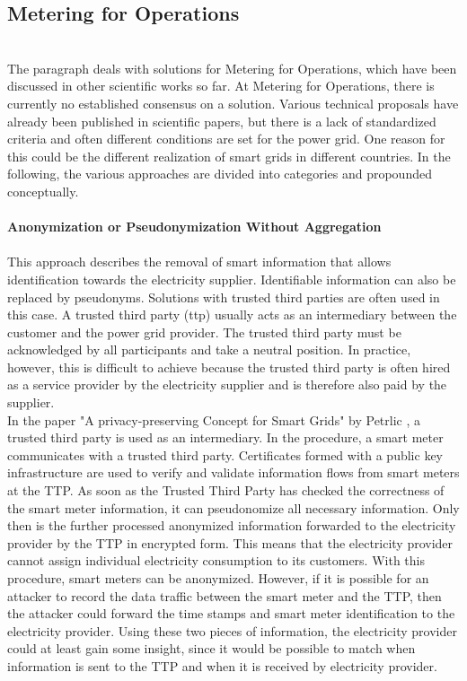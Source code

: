 \subsection{Metering for Operations}
\label{subsec:Meter_for_Op}
\\
The paragraph deals with solutions for Metering for Operations, which have been discussed in other scientific works so far. At Metering for Operations, there is currently no established consensus on a solution. Various technical proposals have already been published in scientific papers, but there is a lack of standardized criteria and often different conditions are set for the power grid. One reason for this could be the different realization of smart grids in different countries. In the following, the various approaches are divided into categories and propounded conceptually.\\
\\
\textbf{Anonymization or Pseudonymization
Without Aggregation}
\\
\\
This approach describes the removal of smart information that allows identification towards the electricity supplier. Identifiable information can also be replaced by pseudonyms. Solutions with trusted third parties are often used in this case. A trusted third party (ttp) usually acts as an intermediary between the customer and the power grid provider. The trusted third party must be acknowledged by all participants and take a neutral position. In practice, however, this is difficult to achieve because the trusted third party is often hired as a service provider by the electricity supplier and is therefore also paid by the supplier.\\
In the paper "A privacy-preserving Concept for Smart Grids" by Petrlic \cite{petrlic2010privacy}, a trusted third party is used as an intermediary. In the procedure, a smart meter communicates with a trusted third party. Certificates formed with a public key infrastructure are used to verify and validate information flows from smart meters at the TTP. As soon as the Trusted Third Party has checked the correctness of the smart meter information, it can pseudonomize all necessary information. Only then is the further processed anonymized information forwarded to the electricity provider by the TTP in encrypted form. This means that the electricity provider cannot assign individual electricity consumption to its customers. With this procedure, smart meters can be anonymized. 
However, if it is possible for an attacker to record the data traffic between the smart meter and the TTP, then the attacker could forward the time stamps and smart meter identification to the electricity provider. Using these two pieces of information, the electricity provider could at least gain some insight, since it would be possible to match when information is sent to the TTP and when it is received by electricity provider\cite{finster2014privacy}. \\
